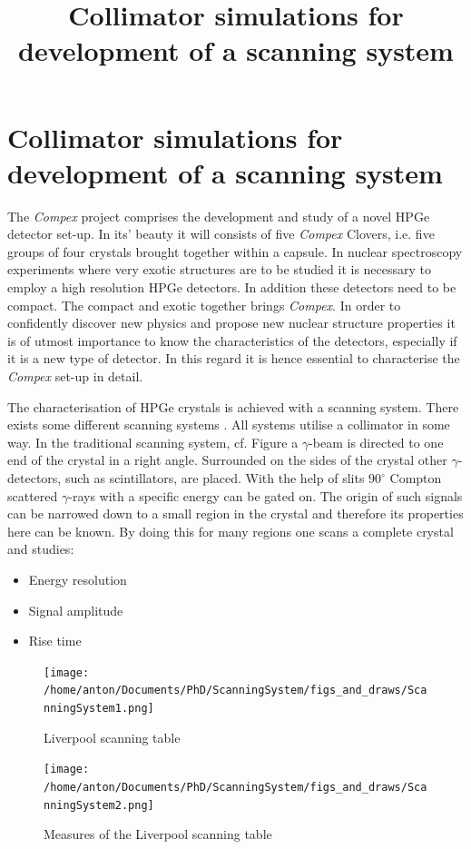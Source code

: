 \documentclass[a4paper]{article}
\title{Collimator simulations for development of a scanning system}
\begin{document}
\section{Collimator simulations for development of a scanning system}

The \textit{Compex} project comprises the development and study of a novel HPGe detector set-up. In its' beauty it will consists of five \textit{Compex} Clovers, i.e. five groups of four crystals brought together within a capsule.
In nuclear spectroscopy experiments where very exotic structures are to be studied it is necessary to employ a high resolution HPGe detectors.
In addition these detectors need to be compact.
The compact and exotic together brings \textit{Compex}.
In order to confidently discover new physics and propose new nuclear structure properties it is of utmost importance to know the characteristics of the detectors, especially if it is a new type of detector.
In this regard it is hence essential to characterise the \textit{Compex} set-up in detail.

The characterisation of HPGe crystals is achieved with a scanning system.
There exists some different scanning systems \cite{phd:Dimmock, art:Crespi, art:Domingo}.
All systems utilise a collimator in some way.
In the traditional scanning system, cf. Figure  a $\gamma$-beam is directed to one end of the crystal in a right angle.
Surrounded on the sides of the crystal other $\gamma$-detectors, such as scintillators, are placed. With the help of slits $90 ^\circ$ Compton scattered $\gamma$-rays with a specific energy can be gated on.
The origin of such signals can be narrowed down to a small region in the crystal and therefore its properties here can be known.
By doing this for many regions one scans a complete crystal and studies:
\begin{itemize}
  \item Energy resolution
  \item Signal amplitude
  \item Rise time
\end{itemize}

\begin{figure}[H]
  \centering
  \texttt{[image: /home/anton/Documents/PhD/ScanningSystem/figs\_and\_draws/ScanningSystem1.png]}
  \caption{Liverpool scanning table \cite{phd:Dimmock}}
  \label{fig:livScanning}
\end{figure}

\begin{figure}[H]
  \centering
  \texttt{[image: /home/anton/Documents/PhD/ScanningSystem/figs\_and\_draws/ScanningSystem2.png]}
  \caption{Measures of the Liverpool scanning table \cite{phd:Dimmock}}
  \label{fig:livScanning2}
\end{figure}
\end{document}
